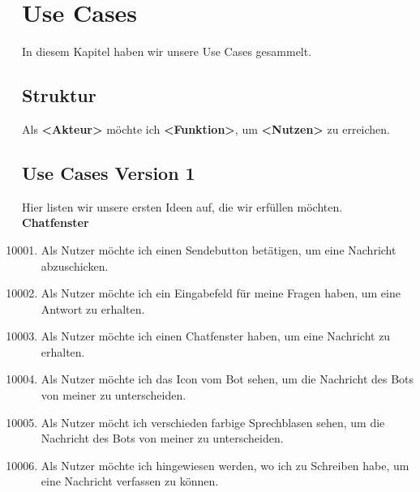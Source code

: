 \newcommand{\indentitem}{\setlength\itemindent{30pt}}


\section{Use Cases}
In diesem Kapitel haben wir unsere Use Cases gesammelt.

\subsection{Struktur}
Als \textbf{<Akteur>} möchte ich \textbf{<Funktion>}, um \textbf{<Nutzen>} zu erreichen.
\subsection{Use Cases Version 1}
Hier listen wir unsere ersten Ideen auf, die wir erfüllen möchten.
\\

\textbf{Chatfenster}
\begin{enumerate}[leftmargin=*,labelindent=40pt,label=u\arabic*.]
    \setcounter{enumi}{10000}
   \item Als Nutzer möchte ich einen Sendebutton betätigen, um eine Nachricht abzuschicken. 
  \item Als Nutzer möchte ich ein Eingabefeld für meine Fragen haben, um eine Antwort zu erhalten.
    \item Als Nutzer möchte ich einen Chatfenster haben, um eine Nachricht zu erhalten. 
    \item Als Nutzer möchte ich das Icon vom Bot sehen, um die Nachricht des Bots von meiner zu unterscheiden. 
  \item Als Nutzer möcht ich verschieden farbige Sprechblasen sehen, um die Nachricht des Bots von meiner zu unterscheiden. 
   \item Als Nutzer möchte ich hingewiesen werden, wo ich zu Schreiben habe, um eine Nachricht verfassen zu können. 
\end{enumerate}


